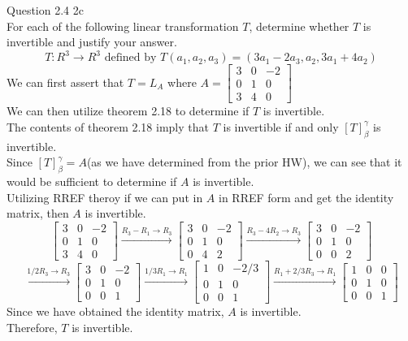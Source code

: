 \documentclass[answers,12pt,addpoints]{exam}
\begin{document}
\begin{questions}
\question Question 2.4 2c\\
For each of the following linear transformation $T$, determine whether $T$ is invertible and justify your answer.
$$T: R^3 \to R^3 \text{ defined by } T(a_1, a_2, a_3) = (3a_1 - 2a_3, a_2, 3a_1 + 4a_2)$$
We can first assert that $T = L_A$ where $A = \begin{bmatrix} 3 & 0 & -2 \\ 0 & 1 & 0 \\ 3 & 4 & 0 \end{bmatrix}$\\
We can then utilize theorem 2.18 to determine if $T$ is invertible.\\
The contents of theorem 2.18 imply that $T$ is invertible if and only $[T]_\beta^\gamma$ is invertible.\\
Since $[T]_\beta^\gamma = A$(as we have determined from the prior HW), we can see that it would be sufficient to determine if $A$ is invertible.\\
Utilizing RREF theroy if we can put in $A$ in RREF form and get the identity matrix, then $A$ is invertible.\\
$$ \begin{bmatrix}
    3 & 0 & -2\\
    0 & 1 & 0\\
    3 & 4 & 0
\end{bmatrix} \xrightarrow{R_3 - R_1 \to R_3} \begin{bmatrix}
    3 & 0 & -2\\
    0 & 1 & 0\\
    0 & 4 & 2
\end{bmatrix} \xrightarrow{R_3 - 4R_2 \to R_3} \begin{bmatrix}
    3 & 0 & -2\\
    0 & 1 & 0\\
    0 & 0 & 2
\end{bmatrix} $$
$$ \xrightarrow{{1/2}R_3 \to R_3} \begin{bmatrix}
    3 & 0 & -2\\
    0 & 1 & 0\\
    0 & 0 & 1
\end{bmatrix} \xrightarrow{{1/3}R_1 \to R_1} \begin{bmatrix}
    1 & 0 & -2/3\\
    0 & 1 & 0\\
    0 & 0 & 1
\end{bmatrix} \xrightarrow{R_1 + 2/3R_3 \to R_1} \begin{bmatrix}
    1 & 0 & 0\\
    0 & 1 & 0\\
    0 & 0 & 1
\end{bmatrix}$$
Since we have obtained the identity matrix, $A$ is invertible.\\
Therefore, $T$ is invertible.\\


\end{questions}
\end{document}

